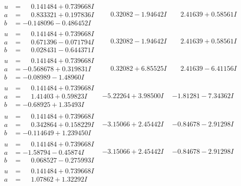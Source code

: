 \documentclass[1p]{elsarticle_modified}
\theoremstyle{definition}
\begin{document}
$$\begin{array}{c|c|c}
 \hline 
\begin{aligned}
u &= \phantom{-}0.141484 + 0.739668 I \\
a &= \phantom{-}0.833321 + 0.197836 I \\
b &= -0.148096 - 0.486452 I\end{aligned}
 & \phantom{-}0.32082 - 1.94642 I & \phantom{-}2.41639 + 0.58561 I \\ \hline\begin{aligned}
u &= \phantom{-}0.141484 + 0.739668 I \\
a &= \phantom{-}0.671396 - 0.071794 I \\
b &= \phantom{-}0.028431 - 0.644371 I\end{aligned}
 & \phantom{-}0.32082 - 1.94642 I & \phantom{-}2.41639 + 0.58561 I \\ \hline\begin{aligned}
u &= \phantom{-}0.141484 + 0.739668 I \\
a &= -0.568678 + 0.319831 I \\
b &= -0.08989 - 1.48960 I\end{aligned}
 & \phantom{-}0.32082 + 6.85525 I & \phantom{-}2.41639 - 6.41156 I \\ \hline\begin{aligned}
u &= \phantom{-}0.141484 + 0.739668 I \\
a &= \phantom{-}1.41403 + 0.59823 I \\
b &= -0.68925 + 1.35493 I\end{aligned}
 & -5.22264 + 3.98500 I & -1.81281 - 7.34362 I \\ \hline\begin{aligned}
u &= \phantom{-}0.141484 + 0.739668 I \\
a &= \phantom{-}0.342864 + 0.158229 I \\
b &= -0.114649 + 1.239450 I\end{aligned}
 & -3.15066 + 2.45442 I & -0.84678 - 2.91298 I \\ \hline\begin{aligned}
u &= \phantom{-}0.141484 + 0.739668 I \\
a &= -1.58794 - 0.45874 I \\
b &= \phantom{-}0.068527 - 0.275993 I\end{aligned}
 & -3.15066 + 2.45442 I & -0.84678 - 2.91298 I \\ \hline\begin{aligned}
u &= \phantom{-}0.141484 + 0.739668 I \\
a &= \phantom{-}1.07862 + 1.32292 I \\

\end{aligned}
\end{array}$$
\end{document}

